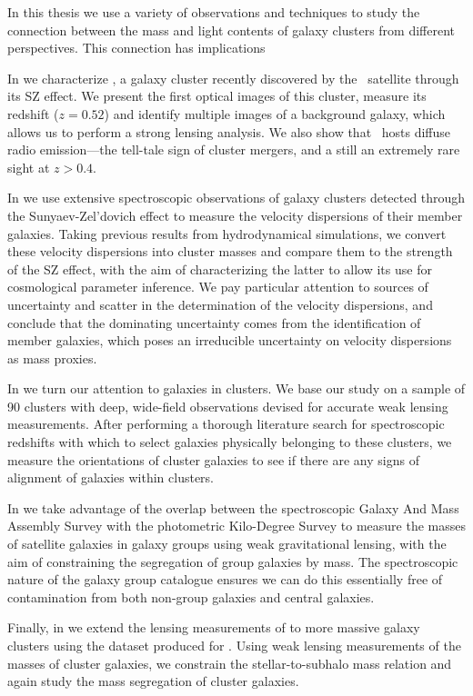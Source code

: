 In this thesis we use a variety of observations and techniques to study the connection between the mass and light contents of galaxy clusters from different perspectives. This connection has implications

In  we characterize \plck, a galaxy cluster recently discovered by the \planck\ satellite through its SZ effect. We present the first optical images of this cluster, measure its redshift ($z=0.52$) and identify multiple images of a background galaxy, which allows us to perform a strong lensing analysis. We also show that \plck\ hosts diffuse radio emission---the tell-tale sign of cluster mergers, and a still an extremely rare sight at $z>0.4$.

In  we use extensive spectroscopic observations of galaxy clusters detected through the Sunyaev-Zel'dovich effect to measure the velocity dispersions of their member galaxies. Taking previous results from hydrodynamical simulations, we convert these velocity dispersions into cluster masses and compare them to the strength of the SZ effect, with the aim of characterizing the latter to allow its use for cosmological parameter inference. We pay particular attention to sources of uncertainty and scatter in the determination of the velocity dispersions, and conclude that the dominating uncertainty comes from the identification of member galaxies, which poses an irreducible uncertainty on velocity dispersions as mass proxies.

In  we turn our attention to galaxies in clusters. We base our study on a sample of 90 clusters with deep, wide-field observations devised for accurate weak lensing measurements. After performing a thorough literature search for spectroscopic redshifts with which to select galaxies physically belonging to these clusters, we measure the orientations of cluster galaxies to see if there are any signs of alignment of galaxies within clusters.

In  we take advantage of the overlap between the spectroscopic Galaxy And Mass Assembly Survey with the photometric Kilo-Degree Survey to measure the masses of satellite galaxies in galaxy groups using weak gravitational lensing, with the aim of constraining the segregation of group galaxies by mass. The spectroscopic nature of the galaxy group catalogue ensures we can do this essentially free of contamination from both non-group galaxies and central galaxies.

Finally, in  we extend the lensing measurements of  to more massive galaxy clusters using the dataset produced for . Using weak lensing measurements of the masses of cluster galaxies, we constrain the stellar-to-subhalo mass relation and again study the mass segregation of cluster galaxies.


